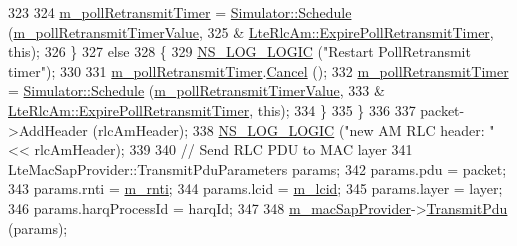 \begin{DoxyCode}
323 
324                           \hyperlink{classns3_1_1LteRlcAm_a9b34f6f4c6993ae026b95be1f63aacfa}{m\_pollRetransmitTimer} = 
      \hyperlink{classns3_1_1Simulator_a671882c894a08af4a5e91181bf1eec13}{Simulator::Schedule} (\hyperlink{classns3_1_1LteRlcAm_ad007e35ba39e42ed6438d9a15c9e31df}{m\_pollRetransmitTimerValue},
325                                                                        &
      \hyperlink{classns3_1_1LteRlcAm_a1fa21fbf53996368b8aeea6ed63f5c53}{LteRlcAm::ExpirePollRetransmitTimer}, \textcolor{keyword}{this});
326                         \}
327                       \textcolor{keywordflow}{else}
328                         \{
329                           \hyperlink{group__logging_ga88acd260151caf2db9c0fc84997f45ce}{NS\_LOG\_LOGIC} (\textcolor{stringliteral}{"Restart PollRetransmit timer"});
330 
331                           \hyperlink{classns3_1_1LteRlcAm_a9b34f6f4c6993ae026b95be1f63aacfa}{m\_pollRetransmitTimer}.\hyperlink{classns3_1_1EventId_a993ae94e48e014e1afd47edb16db7a11}{Cancel} ();
332                           \hyperlink{classns3_1_1LteRlcAm_a9b34f6f4c6993ae026b95be1f63aacfa}{m\_pollRetransmitTimer} = 
      \hyperlink{classns3_1_1Simulator_a671882c894a08af4a5e91181bf1eec13}{Simulator::Schedule} (\hyperlink{classns3_1_1LteRlcAm_ad007e35ba39e42ed6438d9a15c9e31df}{m\_pollRetransmitTimerValue},
333                                                                        &
      \hyperlink{classns3_1_1LteRlcAm_a1fa21fbf53996368b8aeea6ed63f5c53}{LteRlcAm::ExpirePollRetransmitTimer}, \textcolor{keyword}{this});
334                         \}
335                     \}
336 
337                   packet->AddHeader (rlcAmHeader);
338                   \hyperlink{group__logging_ga88acd260151caf2db9c0fc84997f45ce}{NS\_LOG\_LOGIC} (\textcolor{stringliteral}{"new AM RLC header: "} << rlcAmHeader);
339                   
340                   \textcolor{comment}{// Send RLC PDU to MAC layer}
341                   LteMacSapProvider::TransmitPduParameters params;
342                   params.pdu = packet;
343                   params.rnti = \hyperlink{classns3_1_1LteRlc_a48ab0a78e7f2687337075b1c8832df70}{m\_rnti};
344                   params.lcid = \hyperlink{classns3_1_1LteRlc_a051085e9b27883e7ba4b98ad7242fd8a}{m\_lcid};
345                   params.layer = layer;
346                   params.harqProcessId = harqId;
347                   
348                   \hyperlink{classns3_1_1LteRlc_a69272d17c4e48183bb89b8dd0660c1be}{m\_macSapProvider}->\hyperlink{classns3_1_1LteMacSapProvider_a125622cc614fa4ef620d595fbec0cf07}{TransmitPdu} (params);

\end{DoxyCode}
